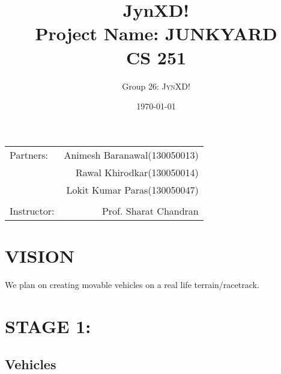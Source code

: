 \documentclass[a4paper,11pt]{article}
\title{JynXD! \\ Project Name: JUNKYARD \\ CS 251} %
\author{Group 26: \textsc{JynXD!}} %
\date{\today} %
\begin{document}
\maketitle %

\begin{center}
\begin{tabular}{l r}
Partners: & Animesh Baranawal(130050013) \\ %
& Rawal Khirodkar(130050014) \\
& Lokit Kumar Paras(130050047) \\
\\
Instructor: & Prof. Sharat Chandran %
\end{tabular}
\end{center}



\section{VISION}

We plan on creating movable vehicles on a real life terrain/racetrack.


\section{STAGE 1:}

\subsection{Vehicles}
\end{document}
